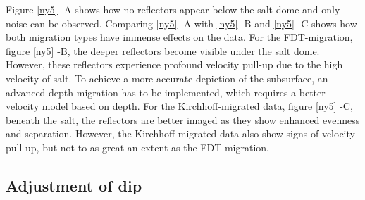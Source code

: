 \documentclass[10pt,a4paper]{article}
\begin{document}
\noindent Figure \ref{ny5} -A shows how no reflectors appear below the salt dome and only noise can be observed. Comparing \ref{ny5} -A with \ref{ny5} -B and \ref{ny5} -C shows how both migration types have immense effects on the data. For the FDT-migration, figure \ref{ny5} -B, the deeper reflectors become visible under the salt dome. However, these reflectors experience profound velocity pull-up due to the high velocity of salt. To achieve a more accurate depiction of the subsurface, an advanced depth migration has to be implemented, which requires a better velocity model based on depth. For the Kirchhoff-migrated data, figure \ref{ny5} -C, beneath the salt, the reflectors are better imaged as they show enhanced evenness and separation. However, the Kirchhoff-migrated data also show signs of velocity pull up, but not to as great an extent as the FDT-migration. 

\subsection{Adjustment of dip}
\end{document}
